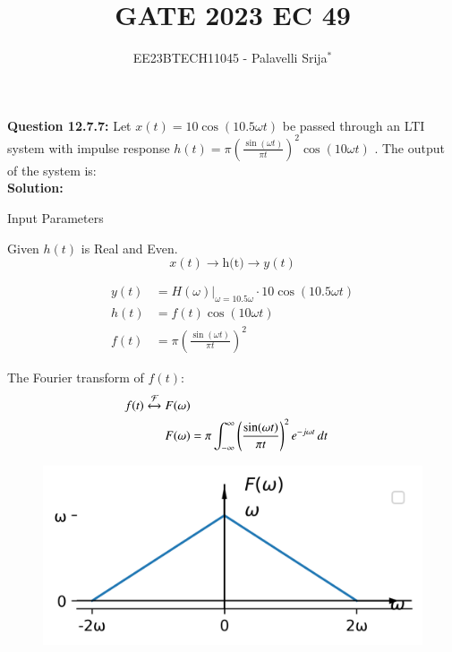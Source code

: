 \documentclass[journal,12pt,twocolumn]{IEEEtran}
\begin{document}
\title{GATE 2023 EC 49}
\author{EE23BTECH11045 - Palavelli Srija$^{*}$}
\maketitle

\bigskip

\textbf{Question 12.7.7:} 
Let $x(t) = 10 \cos(10.5 \omega t)$ be passed through an LTI system with impulse response $h(t) = \pi\left(\frac{\sin(\omega t)}{\pi t}\right)^2 \cos(10 \omega t)$ . The output of the system is: \\

\textbf{Solution:}
\begin{table}[h!]
    \centering
    
    \caption{Input Parameters}
    \label{tab:table_sr4}
\end{table}

Given \(h(t)\) is Real and Even. 
\[
x(t) \xrightarrow{\text{}} \boxed{\text{h(t)}} \xrightarrow{\text{}} y(t)
\]

\begin{align}
y(t) &= H(\omega)\bigg|_{\omega=10.5\omega} \cdot 10 \cos(10.5 \omega t) \\
h(t) &= f(t) \cos(10 \omega t) \\
f(t) &= \pi\left(\frac{\sin(\omega t)}{\pi t}\right)^2 
\end{align}

The Fourier transform of \(f(t)\):
\begin{align}
f(t) \xleftrightarrow{\mathcal{F}} F(\omega)\\
F(\omega)&= \pi\int_{-\infty}^{\infty}\left(\frac{\sin(\omega t)}{\pi t}\right)^2e^{-j\omega t}\,dt 
\end{align}
\begin{figure}[ht!]
    \centering
    \includegraphics[width=\columnwidth]{figs/plot2.png}
    \caption{}
    \label{fig:sr2}
\end{figure}
\end{document}
